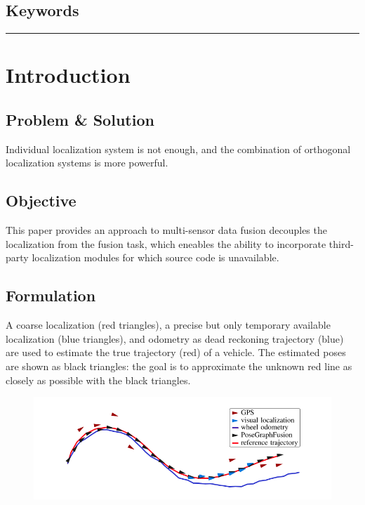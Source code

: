 \documentclass[letterpaper,10pt]{article}
\begin{document}
\subsection{Keywords}

\begin{center}\rule{\textwidth}{1pt}\end{center}
\section{Introduction}

\subsection{Problem \& Solution}

Individual localization system is not enough, and the combination of orthogonal localization systems is more powerful.

\subsection{Objective}

This paper provides an approach to multi-sensor data fusion decouples the localization from the fusion task, which eneables the ability to incorporate third-party localization modules for which source code is unavailable.

\subsection{Formulation}

A coarse localization (red triangles), a precise but only temporary available localization (blue triangles), and odometry as dead reckoning trajectory (blue) are used to estimate the true trajectory (red) of a vehicle. The estimated poses are shown as black triangles: the goal is to approximate the unknown red line as closely as possible with the black triangles.

\begin{figure}[!ht]
	\centering
	\includegraphics[width=15cm]{./img/posefusion.png}
\end{figure}
\end{document}
